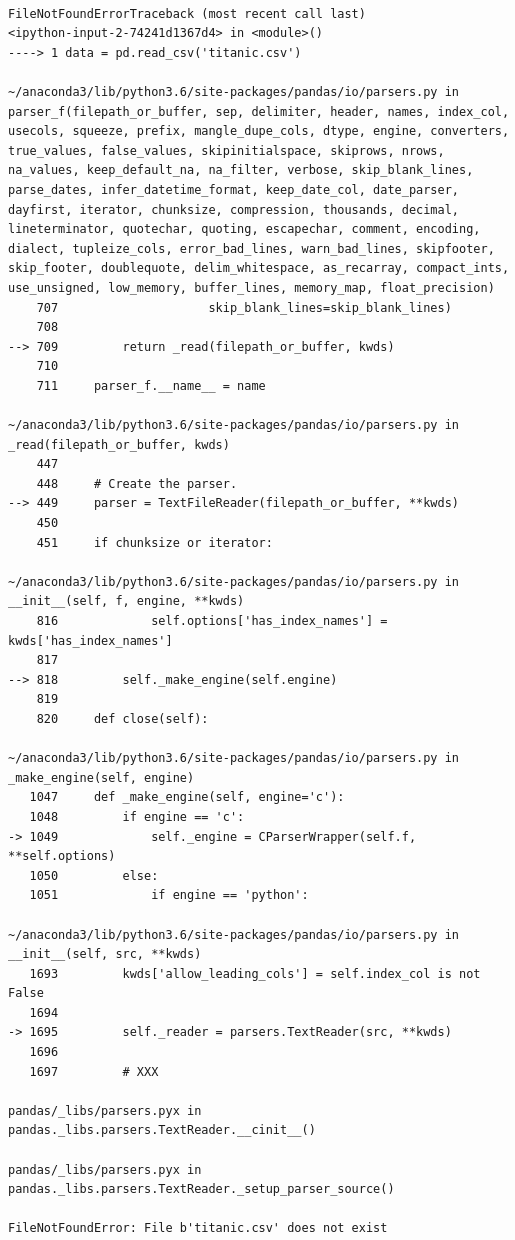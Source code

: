 \documentclass[11pt]{article}
\begin{document}
\begin{verbatim}

FileNotFoundErrorTraceback (most recent call last)
<ipython-input-2-74241d1367d4> in <module>()
----> 1 data = pd.read_csv('titanic.csv')

~/anaconda3/lib/python3.6/site-packages/pandas/io/parsers.py in parser_f(filepath_or_buffer, sep, delimiter, header, names, index_col, usecols, squeeze, prefix, mangle_dupe_cols, dtype, engine, converters, true_values, false_values, skipinitialspace, skiprows, nrows, na_values, keep_default_na, na_filter, verbose, skip_blank_lines, parse_dates, infer_datetime_format, keep_date_col, date_parser, dayfirst, iterator, chunksize, compression, thousands, decimal, lineterminator, quotechar, quoting, escapechar, comment, encoding, dialect, tupleize_cols, error_bad_lines, warn_bad_lines, skipfooter, skip_footer, doublequote, delim_whitespace, as_recarray, compact_ints, use_unsigned, low_memory, buffer_lines, memory_map, float_precision)
    707                     skip_blank_lines=skip_blank_lines)
    708 
--> 709         return _read(filepath_or_buffer, kwds)
    710 
    711     parser_f.__name__ = name

~/anaconda3/lib/python3.6/site-packages/pandas/io/parsers.py in _read(filepath_or_buffer, kwds)
    447 
    448     # Create the parser.
--> 449     parser = TextFileReader(filepath_or_buffer, **kwds)
    450 
    451     if chunksize or iterator:

~/anaconda3/lib/python3.6/site-packages/pandas/io/parsers.py in __init__(self, f, engine, **kwds)
    816             self.options['has_index_names'] = kwds['has_index_names']
    817 
--> 818         self._make_engine(self.engine)
    819 
    820     def close(self):

~/anaconda3/lib/python3.6/site-packages/pandas/io/parsers.py in _make_engine(self, engine)
   1047     def _make_engine(self, engine='c'):
   1048         if engine == 'c':
-> 1049             self._engine = CParserWrapper(self.f, **self.options)
   1050         else:
   1051             if engine == 'python':

~/anaconda3/lib/python3.6/site-packages/pandas/io/parsers.py in __init__(self, src, **kwds)
   1693         kwds['allow_leading_cols'] = self.index_col is not False
   1694 
-> 1695         self._reader = parsers.TextReader(src, **kwds)
   1696 
   1697         # XXX

pandas/_libs/parsers.pyx in pandas._libs.parsers.TextReader.__cinit__()

pandas/_libs/parsers.pyx in pandas._libs.parsers.TextReader._setup_parser_source()

FileNotFoundError: File b'titanic.csv' does not exist
\end{verbatim}
\end{document}

